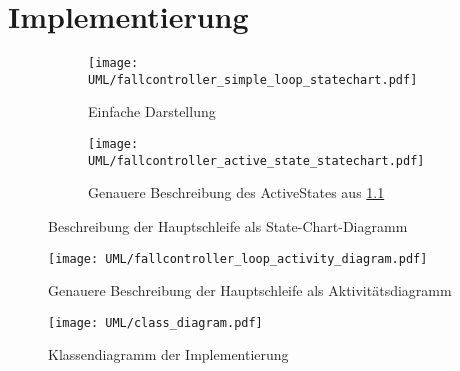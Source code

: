 \chapter{Implementierung}



\begin{figure}[hb] \centering
	\begin{subfigure}[b]{0.4\textwidth}
  		\texttt{[image: UML/fallcontroller\_simple\_loop\_statechart.pdf]}
		\caption{Einfache Darstellung}
		\label{uml:statechart_simleloop}
	\end{subfigure}\hspace{1cm}
	\begin{subfigure}[b]{0.4\textwidth}
 		\texttt{[image: UML/fallcontroller\_active\_state\_statechart.pdf]}
  		\caption{Genauere Beschreibung des ActiveStates aus \ref{uml:statechart_simleloop}}
  		\label{uml:statechart_activeState}
	\end{subfigure}
	\caption{Beschreibung der Hauptschleife als State-Chart-Diagramm}
	\label{uml:statechart}
\end{figure}

\begin{figure}[hb] \centering
\end{figure}

\begin{figure}[hb] \centering
  \texttt{[image: UML/fallcontroller\_loop\_activity\_diagram.pdf]}
  \caption{Genauere Beschreibung der Hauptschleife als Aktivitätsdiagramm}
  \label{uml:activity_diagram}
\end{figure}

\begin{figure}[hb] \centering
  \texttt{[image: UML/class\_diagram.pdf]}
  \caption{Klassendiagramm der Implementierung}
  \label{uml:class_diagram}
\end{figure}
